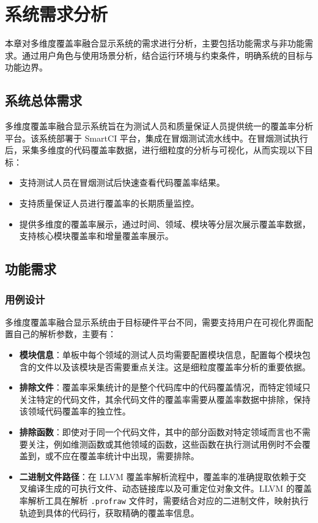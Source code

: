 
\chapter{系统需求分析}
    本章对多维度覆盖率融合显示系统的需求进行分析，主要包括功能需求与非功能需求。通过用户角色与使用场景分析，结合运行环境与约束条件，明确系统的目标与功能边界。

\section{系统总体需求}
    多维度覆盖率融合显示系统旨在为测试人员和质量保证人员提供统一的覆盖率分析平台。该系统部署于 SmartCI 平台，集成在冒烟测试流水线中。在冒烟测试执行后，采集多维度的代码覆盖率数据，进行细粒度的分析与可视化，从而实现以下目标：
    \begin{itemize}
        \item 支持测试人员在冒烟测试后快速查看代码覆盖率结果。
        \item 支持质量保证人员进行覆盖率的长期质量监控。
        \item 提供多维度的覆盖率展示，通过时间、领域、模块等分层次展示覆盖率数据，支持核心模块覆盖率和增量覆盖率展示。
    \end{itemize}

\section{功能需求}
\subsection{用例设计}
    多维度覆盖率融合显示系统由于目标硬件平台不同，需要支持用户在可视化界面配置自己的解析参数，主要有：
    \begin{itemize}
        \item \textbf{模块信息}：单板中每个领域的测试人员均需要配置模块信息，配置每个模块包含的文件以及该模块是否需要重点关注。这是细粒度覆盖率分析的重要依据。
        \item \textbf{排除文件}：覆盖率采集统计的是整个代码库中的代码覆盖情况，而特定领域只关注特定的代码文件，其余代码文件的覆盖率需要从覆盖率数据中排除，保持该领域代码覆盖率的独立性。
        \item \textbf{排除函数}：即使对于同一个代码文件，其中的部分函数对特定领域而言也不需要关注，例如维测函数或其他领域的函数，这些函数在执行测试用例时不会覆盖到，或不应在覆盖率统计中出现，需要排除。
        \item \textbf{二进制文件路径}：在 LLVM 覆盖率解析流程中，覆盖率的准确提取依赖于交叉编译生成的可执行文件、动态链接库以及可重定位对象文件。LLVM 的覆盖率解析工具在解析 \verb|.profraw| 文件时，需要结合对应的二进制文件，映射执行轨迹到具体的代码行，获取精确的覆盖率信息。
    \end{itemize}

